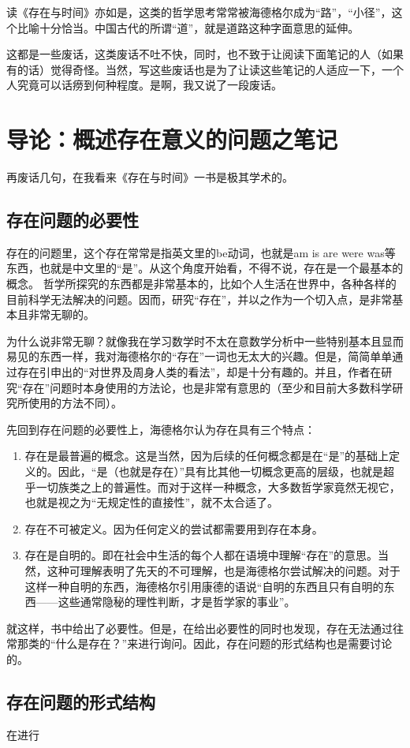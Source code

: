 \documentclass[11pt]{article}
\begin{document}
读《存在与时间》亦如是，这类的哲学思考常常被海德格尔成为“路”，“小径”，这个比喻十分恰当。中国古代的所谓“道”，就是道路这种字面意思的延伸。

这都是一些废话，这类废话不吐不快，同时，也不致于让阅读下面笔记的人（如果有的话）觉得奇怪。当然，写这些废话也是为了让读这些笔记的人适应一下，一个人究竟可以话痨到何种程度。是啊，我又说了一段废话。


\section{导论：概述存在意义的问题之笔记}
\label{sec:org98f45cf}
再废话几句，在我看来《存在与时间》一书是极其学术的。
\subsection{存在问题的必要性}
\label{sec:orgd4fbcca}
存在的问题里，这个存在常常是指英文里的be动词，也就是am is are were was等东西，也就是中文里的“是”。从这个角度开始看，不得不说，存在是一个最基本的概念。
哲学所探究的东西都是非常基本的，比如个人生活在世界中，各种各样的目前科学无法解决的问题。因而，研究“存在”，并以之作为一个切入点，是非常基本且非常无聊的。

为什么说非常无聊？就像我在学习数学时不太在意数学分析中一些特别基本且显而易见的东西一样，我对海德格尔的“存在”一词也无太大的兴趣。但是，简简单单通过存在引申出的“对世界及周身人类的看法”，却是十分有趣的。并且，作者在研究“存在”问题时本身使用的方法论，也是非常有意思的（至少和目前大多数科学研究所使用的方法不同）。

先回到存在问题的必要性上，海德格尔认为存在具有三个特点：
\begin{enumerate}
\item 存在是最普遍的概念。这是当然，因为后续的任何概念都是在“是”的基础上定义的。因此，“是（也就是存在）”具有比其他一切概念更高的层级，也就是超乎一切族类之上的普遍性。而对于这样一种概念，大多数哲学家竟然无视它，也就是视之为“无规定性的直接性”，就不太合适了。
\item 存在不可被定义。因为任何定义的尝试都需要用到存在本身。
\item 存在是自明的。即在社会中生活的每个人都在语境中理解“存在”的意思。当然，这种可理解表明了先天的不可理解，也是海德格尔尝试解决的问题。对于这样一种自明的东西，海德格尔引用康德的语说“自明的东西且只有自明的东西——这些通常隐秘的理性判断，才是哲学家的事业”。
\end{enumerate}

就这样，书中给出了必要性。但是，在给出必要性的同时也发现，存在无法通过往常那类的“什么是存在？”来进行询问。因此，存在问题的形式结构也是需要讨论的。
\subsection{存在问题的形式结构}
\label{sec:org7c0d418}
在进行
\end{document}
